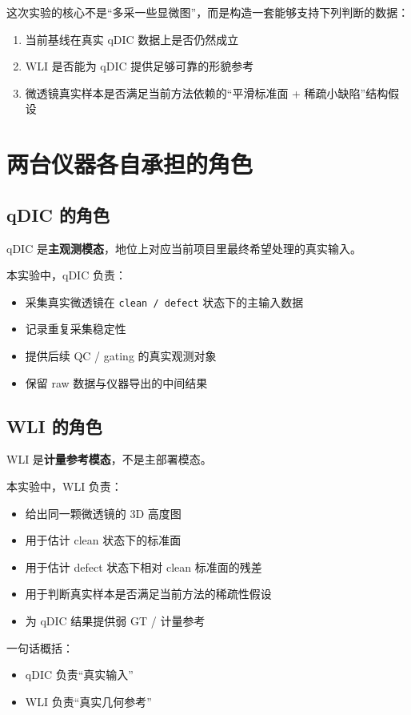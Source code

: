 \documentclass[UTF8,a4paper,11pt]{ctexart}
\newcommand{\Code}[1]{\texttt{#1}}
\newcommand{\Strong}[1]{\textbf{#1}}
\begin{document}
这次实验的核心不是“多采一些显微图”，而是构造一套能够支持下列判断的数据：
\begin{enumerate}
  \item 当前基线在真实 qDIC 数据上是否仍然成立
  \item WLI 是否能为 qDIC 提供足够可靠的形貌参考
  \item 微透镜真实样本是否满足当前方法依赖的“平滑标准面 + 稀疏小缺陷”结构假设
\end{enumerate}

\section{两台仪器各自承担的角色}

\subsection{qDIC 的角色}

qDIC 是\Strong{主观测模态}，地位上对应当前项目里最终希望处理的真实输入。

本实验中，qDIC 负责：
\begin{itemize}
  \item 采集真实微透镜在 \Code{clean / defect} 状态下的主输入数据
  \item 记录重复采集稳定性
  \item 提供后续 QC / gating 的真实观测对象
  \item 保留 raw 数据与仪器导出的中间结果
\end{itemize}

\subsection{WLI 的角色}

WLI 是\Strong{计量参考模态}，不是主部署模态。

本实验中，WLI 负责：
\begin{itemize}
  \item 给出同一颗微透镜的 3D 高度图
  \item 用于估计 clean 状态下的标准面
  \item 用于估计 defect 状态下相对 clean 标准面的残差
  \item 用于判断真实样本是否满足当前方法的稀疏性假设
  \item 为 qDIC 结果提供弱 GT / 计量参考
\end{itemize}

一句话概括：
\begin{itemize}
  \item qDIC 负责“真实输入”
  \item WLI 负责“真实几何参考”
\end{itemize}
\end{document}

